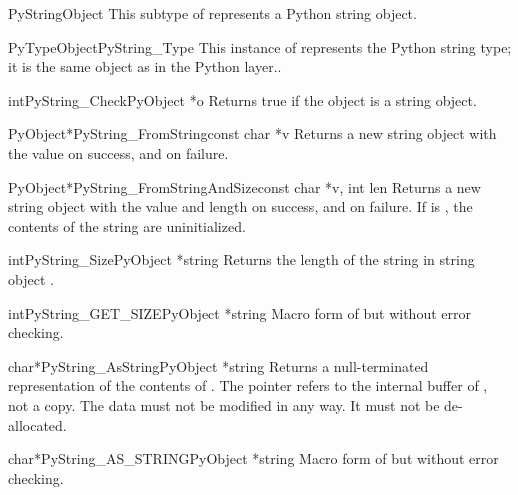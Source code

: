 \documentclass{manual}
\begin{document}
\begin{ctypedesc}{PyStringObject}
This subtype of  represents a Python string object.
\end{ctypedesc}

\begin{cvardesc}{PyTypeObject}{PyString_Type}
This instance of  represents the Python string
type; it is the same object as  in the Python
layer..
\end{cvardesc}

\begin{cfuncdesc}{int}{PyString_Check}{PyObject *o}
Returns true if the object  is a string object.
\end{cfuncdesc}

\begin{cfuncdesc}{PyObject*}{PyString_FromString}{const char *v}
Returns a new string object with the value  on success, and
\NULL{} on failure.
\end{cfuncdesc}

\begin{cfuncdesc}{PyObject*}{PyString_FromStringAndSize}{const char *v,
                                                         int len}
Returns a new string object with the value  and length
 on success, and \NULL{} on failure.  If  is \NULL{},
the contents of the string are uninitialized.
\end{cfuncdesc}

\begin{cfuncdesc}{int}{PyString_Size}{PyObject *string}
Returns the length of the string in string object .
\end{cfuncdesc}

\begin{cfuncdesc}{int}{PyString_GET_SIZE}{PyObject *string}
Macro form of  but without error
checking.
\end{cfuncdesc}

\begin{cfuncdesc}{char*}{PyString_AsString}{PyObject *string}
Returns a null-terminated representation of the contents of
.  The pointer refers to the internal buffer of
, not a copy.  The data must not be modified in any way.
It must not be de-allocated.
\end{cfuncdesc}

\begin{cfuncdesc}{char*}{PyString_AS_STRING}{PyObject *string}
Macro form of  but without error
checking.
\end{cfuncdesc}
\end{document}
